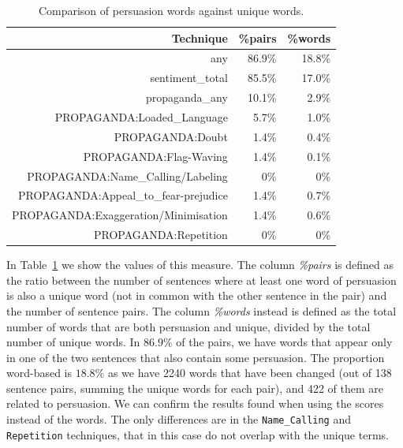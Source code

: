 \begin{table}[!htbp]
    \centering
    \begin{tabular}{r|rr}
         Technique & \%pairs & \%words \\
         \hline
         any & 86.9\% & 18.8\% \\
        sentiment\_total & 85.5\% & 17.0\% \\
        propaganda\_any & 10.1\% & 2.9\% \\
        PROPAGANDA:Loaded\_Language & 5.7\% & 1.0\% \\
        PROPAGANDA:Doubt & 1.4\% & 0.4\% \\
        PROPAGANDA:Flag-Waving & 1.4\% & 0.1\% \\
        PROPAGANDA:Name\_Calling/Labeling & 0\% & 0\% \\
        PROPAGANDA:Appeal\_to\_fear-prejudice & 1.4\% & 0.7\% \\
        PROPAGANDA:Exaggeration/Minimisation & 1.4\% & 0.6\% \\
        PROPAGANDA:Repetition & 0\% & 0\% \\
    \end{tabular}
    \caption{Comparison of persuasion words against unique words.}
    \label{tab:words_persuasion_in_variations}
\end{table}

In Table~\ref{tab:words_persuasion_in_variations} we show the values of this measure.
The column \textit{\%pairs} is defined as the ratio between the number of sentences where at least one word of persuasion is also a unique word (not in common with the other sentence in the pair) and the number of sentence pairs. The column \textit{\%words} instead is defined as the total number of words that are both persuasion and unique, divided by the total number of unique words.
In $86.9\%$ of the pairs, we have words that appear only in one of the two sentences that also contain some persuasion. The proportion word-based is $18.8\%$ as we have 2240 words that have been changed (out of 138 sentence pairs, summing the unique words for each pair), and 422 of them are related to persuasion.
We can confirm the results found when using the scores instead of the words. The only differences are in the \texttt{Name\_Calling} and \texttt{Repetition} techniques, that in this case do not overlap with the unique terms.


